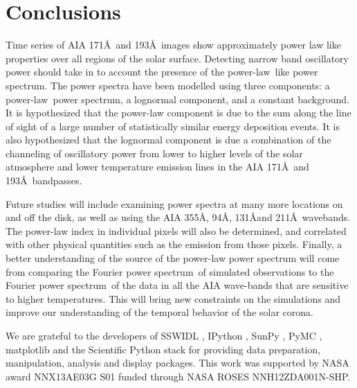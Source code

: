 \documentclass[onecolumn]{emulateapj}
\newcommand{\PS}{power spectrum}
\newcommand{\PL}{power-law}
\newcommand{\Fps}{Fourier \PS}
\begin{document}
\section{Conclusions}\label{sec:conc}

Time series of AIA 171\AA\ and 193\AA\ images show approximately power
law like properties over all regions of the solar surface.  Detecting
narrow band oscillatory power should take in to account the presence
of the \PL\ like \PS.  The power spectra have been modelled using
three components: a \PL\ \PS, a lognormal component, and a constant
background.  It is hypothesized that the power-law component is due to
the sum along the line of sight of a large number of statistically
similar energy deposition events.  It is also hypothesized that the
lognormal component is due a combination of the channeling of
oscillatory power from lower to higher levels of the solar atmosphere
and lower temperature emission lines in the AIA 171\AA\ and
193\AA\ bandpasses.

Future studies will include examining power spectra at many more
locations on and off the disk, as well as using the AIA 355\AA, 94\AA,
131\AA and 211\AA\ wavebands.  The power-law index in individual
pixels will also be determined, and correlated with other physical
quantities such as the emission from those pixels.  Finally, a better
understanding of the source of the power-law power spectrum will come
from comparing the \Fps\ of simulated observations to the \Fps\ of the
data in all the AIA wave-bands that are sensitive to higher
temperatures.  This will bring new constraints on the simulations and
improve our understanding of the temporal behavior of the solar
corona.




\acknowledgments

We are grateful to the developers of SSWIDL
\citep{1998SoPh..182..497F}, IPython \citep{ipython}, SunPy
\citep{mumford-proc-scipy-2013}, PyMC
\citep{Patil:Huard:Fonnesbeck:2010:JSSOBK:v35i04}, matplotlib
\citep{Hunter:2007} and the Scientific Python stack for providing data
preparation, manipulation, analysis and display packages.  This work
was supported by NASA award NNX13AE03G S01 funded through NASA ROSES
NNH12ZDA001N-SHP.
\end{document}
